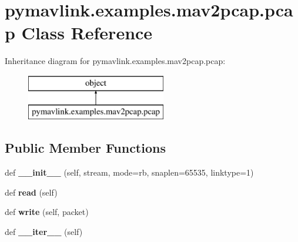 \hypertarget{classpymavlink_1_1examples_1_1mav2pcap_1_1pcap}{}\section{pymavlink.\+examples.\+mav2pcap.\+pcap Class Reference}
\label{classpymavlink_1_1examples_1_1mav2pcap_1_1pcap}
Inheritance diagram for pymavlink.\+examples.\+mav2pcap.\+pcap\+:\begin{figure}[H]
\begin{center}
\leavevmode
\includegraphics[height=2.000000cm]{classpymavlink_1_1examples_1_1mav2pcap_1_1pcap}
\end{center}
\end{figure}
\subsection*{Public Member Functions}
\begin{DoxyCompactItemize}
\item 
\mbox{\label{classpymavlink_1_1examples_1_1mav2pcap_1_1pcap_af7029693ff63df6bbbc019cf023fc287}} 
def {\bfseries \+\_\+\+\_\+init\+\_\+\+\_\+} (self, stream, mode=\textquotesingle{}rb\textquotesingle{}, snaplen=65535, linktype=1)
\item 
\mbox{\label{classpymavlink_1_1examples_1_1mav2pcap_1_1pcap_a115443af4c2e19f902a584b67e021ae8}} 
def {\bfseries read} (self)
\item 
\mbox{\label{classpymavlink_1_1examples_1_1mav2pcap_1_1pcap_adfb468dd44dd0a2d50a9357813438a64}} 
def {\bfseries write} (self, packet)
\item 
\mbox{\label{classpymavlink_1_1examples_1_1mav2pcap_1_1pcap_a409fec0dbf2e76e737d5e0b28ffa3f77}} 
def {\bfseries \+\_\+\+\_\+iter\+\_\+\+\_\+} (self)
\end{DoxyCompactItemize}
